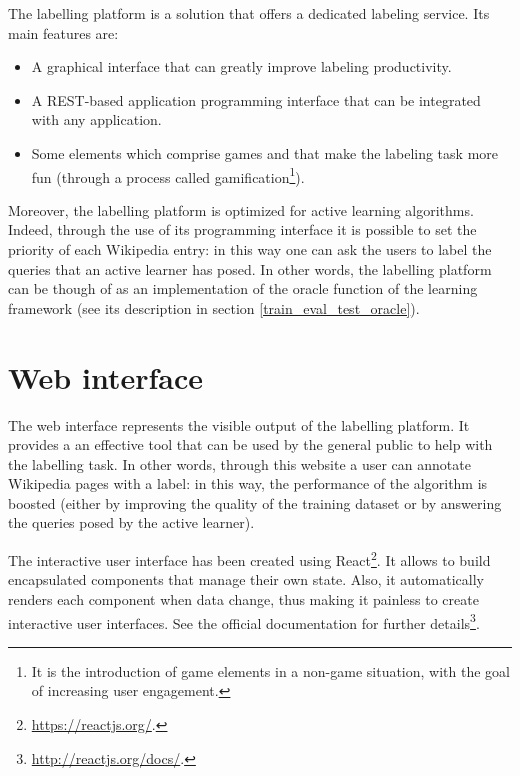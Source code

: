         The labelling platform is a solution that offers a dedicated labeling service. Its main features are:
        \begin{itemize}
            \item A graphical interface that can greatly improve labeling productivity.
            \item A REST-based application programming interface that can be integrated with any application.
            \item Some elements which comprise games and that make the labeling task more fun (through a process called gamification\footnote{It is the introduction of game elements in a non-game situation, with the goal of increasing user engagement.}).
        \end{itemize}
        
        Moreover, the labelling platform is optimized for active learning algorithms. Indeed, through the use of its programming interface it is possible to set the priority of each Wikipedia entry: in this way one can ask the users to label the queries that an active learner has posed. In other words, the labelling platform can be though of as an implementation of the oracle function of the learning framework (see its description in section \ref{train_eval_test_oracle}).
    \section{Web interface}
        The web interface represents the visible output of the labelling platform. It provides a an effective tool that can be used by the general public to help with the labelling task. In other words, through this website a user can annotate Wikipedia pages with a label: in this way, the performance of the algorithm is boosted (either by improving the quality of the training dataset or by answering the queries posed by the active learner).
        
        The interactive user interface has been created using React\footnote{\url{https://reactjs.org/}.}. It allows to build encapsulated components that manage their own state. Also, it automatically renders each component when data change, thus making it painless to create interactive user interfaces. See the official documentation for further details\footnote{\url{http://reactjs.org/docs/}.}.
        
